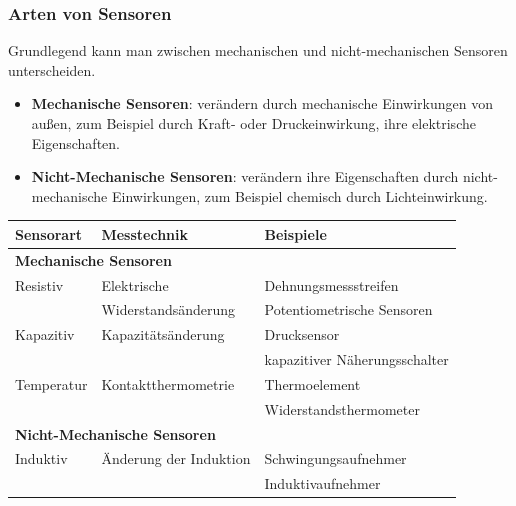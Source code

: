 \begin{flushleft}
	        \subsubsection{Arten von Sensoren \cite{TS_sensor_aufteilen}}
	
	        Grundlegend kann man zwischen mechanischen und nicht-mechanischen Sensoren unterscheiden. \\
	        \begin{itemize}
	            \item \textbf{Mechanische Sensoren}: verändern durch mechanische Einwirkungen von außen, zum Beispiel durch Kraft- oder Druckeinwirkung, ihre elektrische Eigenschaften.
	            \item \textbf{Nicht-Mechanische Sensoren}: verändern ihre Eigenschaften durch nicht-mechanische Einwirkungen, zum Beispiel chemisch durch Lichteinwirkung.
	        \end{itemize}
	        \begin{table}[h]
	        \begin{tabularx}{\textwidth}{l|l|l}
	
	                    \textbf{Sensorart} & \textbf{Messtechnik} & \textbf{Beispiele}\\
						\hline
	                    \multicolumn{3}{l}{\textbf{Mechanische Sensoren}}\\
	                    \hline
						Resistiv & Elektrische & Dehnungsmessstreifen \\
						&Widerstandsänderung& Potentiometrische Sensoren\\
						\hline
	                    
	                    Kapazitiv & Kapazitätsänderung & Drucksensor\\
	                    && kapazitiver Näherungsschalter \\
						\hline
						
						Temperatur & Kontaktthermometrie & Thermoelement\\
						&& Widerstandsthermometer \\
	                    \hline
	
	                    \multicolumn{3}{l}{\textbf{Nicht-Mechanische Sensoren}}\\
	                    \hline
	
	                    Induktiv & Änderung der Induktion & Schwingungsaufnehmer \\
	                    && Induktivaufnehmer\\
	                    \hline
									

\end{tabularx}
\end{table}
\end{flushleft}

